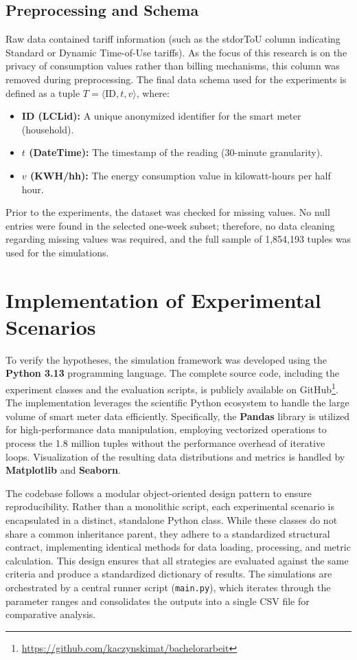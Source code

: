 \subsection{Preprocessing and Schema}
Raw data contained tariff information (such as the stdorToU column indicating Standard or Dynamic Time-of-Use tariffs). As the focus of this research is on the privacy of consumption values rather than billing mechanisms, this column was removed during preprocessing.
The final data schema used for the experiments is defined as a tuple $T = \langle \text{ID}, t, v \rangle$, where:
\begin{itemize}
\item \textbf{ID (LCLid):} A unique anonymized identifier for the smart meter (household).
\item \textbf{$t$ (DateTime):} The timestamp of the reading (30-minute granularity).
\item \textbf{$v$ (KWH/hh):} The energy consumption value in kilowatt-hours per half hour.
\end{itemize}
Prior to the experiments, the dataset was checked for missing values. No null entries were found in the selected one-week subset; therefore, no data cleaning regarding missing values was required, and the full sample of 1,854,193 tuples was used for the simulations.

\section{Implementation of Experimental Scenarios}
\label{sec:scenarios}

To verify the hypotheses, the simulation framework was developed using the \textbf{Python 3.13} programming language. The complete source code, including the experiment classes and the evaluation scripts, is publicly available on GitHub\footnote{\url{https://github.com/kaczynskimat/bachelorarbeit}}. The implementation leverages the scientific Python ecosystem to handle the large volume of smart meter data efficiently. Specifically, the \textbf{Pandas} library is utilized for high-performance data manipulation, employing vectorized operations to process the 1.8 million tuples without the performance overhead of iterative loops. Visualization of the resulting data distributions and metrics is handled by \textbf{Matplotlib} and \textbf{Seaborn}.

The codebase follows a modular object-oriented design pattern to ensure reproducibility. Rather than a monolithic script, each experimental scenario is encapsulated in a distinct, standalone Python class. While these classes do not share a common inheritance parent, they adhere to a standardized structural contract, implementing identical methods for data loading, processing, and metric calculation. This design ensures that all strategies are evaluated against the same criteria and produce a standardized dictionary of results. The simulations are orchestrated by a central runner script (\texttt{main.py}), which iterates through the parameter ranges and consolidates the outputs into a single CSV file for comparative analysis.

